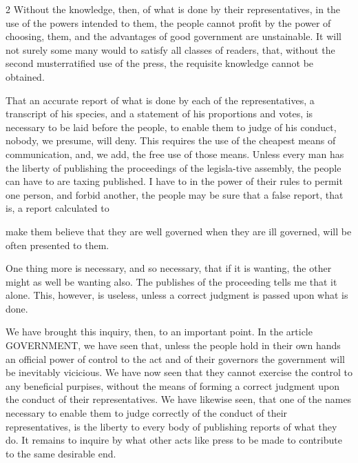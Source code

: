 \documentclass[10pt]{article}
\begin{document}
\begin{multicols}{2}
Without the knowledge, then, of what is done by their representatives, in the use of the powers intended to them, the people cannot profit by the power of choosing, them, and the advantages of good government are unstainable. It will not surely some many would to satisfy all classes of readers, that, without the second musterratified use of the press, the requisite knowledge cannot be obtained.

That an accurate report of what is done by each of the representatives, a transcript of his species, and a statement of his proportions and votes, is necessary to be laid before the people, to enable them to judge of his conduct, nobody, we presume, will deny. This requires the use of the cheapest means of communication, and, we add, the free use of those means. Unless every man has the liberty of publishing the proceedings of the legisla-tive assembly, the people can have to are taxing published. I have to in the power of their rules to permit one person, and forbid another, the people may be sure that a false report, that is, a report calculated to

make them believe that they are well governed when they are ill governed, will be often presented to them.

One thing more is necessary, and so necessary, that if it is wanting, the other might as well be wanting also. The publishes of the proceeding tells me that it alone. This, however, is useless, unless a correct judgment is passed upon what is done.

We have brought this inquiry, then, to an important point. In the article GOVERNMENT, we have seen that, unless the people hold in their own hands an official power of control to the act and of their governors the government will be inevitably vicicious. We have now seen that they cannot exercise the control to any beneficial purpises, without the means of forming a correct judgment upon the conduct of their representatives. We have likewise seen, that one of the names necessary to enable them to judge correctly of the conduct of their representatives, is the liberty to every body of publishing reports of what they do. It remains to inquire by what other acts like press to be made to contribute to the same desirable end.


\end{multicols}
\end{document}
